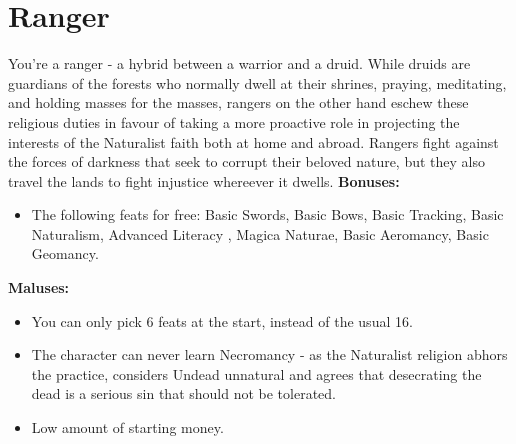 \section{Ranger}
You're a ranger - a hybrid between a warrior and a druid. While druids are guardians of the forests who normally dwell at their shrines, praying, meditating, and holding masses for the masses, rangers on the other hand eschew these religious duties in favour of taking a more proactive role in projecting the interests of the Naturalist faith both at home and abroad. Rangers fight against the forces of darkness that seek to corrupt their beloved nature, but they also travel the lands to fight injustice whereever it dwells.\newline
\textbf{Bonuses:}
\begin{itemize}
	\item The following feats for free: Basic Swords, Basic Bows, Basic Tracking, Basic Naturalism, Advanced Literacy , Magica Naturae, Basic Aeromancy, Basic Geomancy.
\end{itemize}
\textbf{Maluses:}
\begin{itemize}
	\item You can only pick 6 feats at the start, instead of the usual 16.
	\item The character can never learn Necromancy - as the Naturalist religion abhors the practice, considers Undead unnatural and agrees that desecrating the dead is a serious sin that should not be tolerated.
	\item Low amount of starting money.
\end{itemize}
